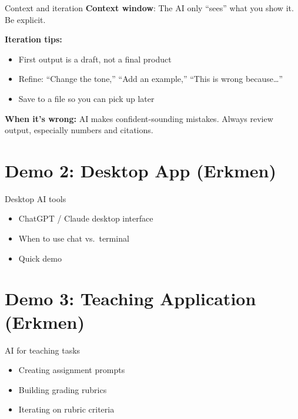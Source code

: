 \documentclass[aspectratio=169]{beamer}
\begin{document}
\begin{frame}{Context and iteration}
\textbf{Context window}: The AI only ``sees'' what you show it. Be explicit.

\bigskip
\textbf{Iteration tips:}
\begin{itemize}
    \item First output is a draft, not a final product
    \item Refine: ``Change the tone,'' ``Add an example,'' ``This is wrong because\ldots''
    \item Save to a file so you can pick up later
\end{itemize}

\bigskip
\textbf{When it's wrong:} AI makes confident-sounding mistakes. Always review output, especially numbers and citations.
\end{frame}

\section{Demo 2: Desktop App (Erkmen)}

\begin{frame}{Desktop AI tools}
\begin{itemize}
    \item ChatGPT / Claude desktop interface
    \item When to use chat vs.\ terminal
    \item Quick demo
\end{itemize}
\end{frame}

\section{Demo 3: Teaching Application (Erkmen)}

\begin{frame}{AI for teaching tasks}
\begin{itemize}
    \item Creating assignment prompts
    \item Building grading rubrics
    \item Iterating on rubric criteria
\end{itemize}
\end{frame}
\end{document}
